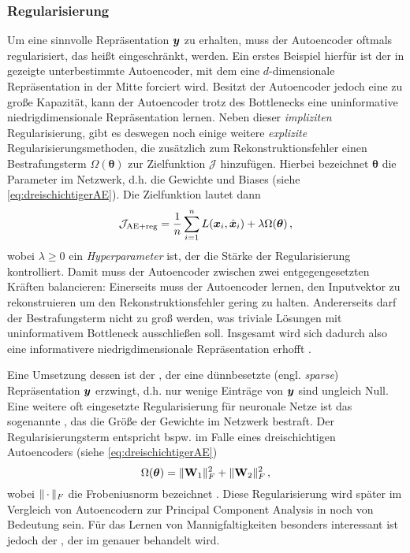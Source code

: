 \subsubsection{Regularisierung}
\label{ch:MethodenDerDimRed:ML:AE:Regularisierung}
Um eine sinnvolle Repräsentation $\bm{y}$ zu erhalten, muss der Autoencoder oftmals
regularisiert, das heißt eingeschränkt, werden. Ein erstes Beispiel hierfür ist der in
 gezeigte unterbestimmte Autoencoder, mit dem eine $d$-dimensionale
Repräsentation in der Mitte forciert wird. Besitzt der Autoencoder jedoch eine zu große Kapazität, kann der Autoencoder trotz des Bottlenecks
eine uninformative niedrigdimensionale Repräsentation lernen. Neben dieser \textit{impliziten} Regularisierung, gibt es deswegen noch einige
weitere \textit{explizite} Regularisierungsmethoden, die zusätzlich zum Rekonstruktionsfehler einen
Bestrafungsterm $\Omega(\bm{\theta})$ zur Zielfunktion $\mathcal{J}$ hinzufügen. Hierbei bezeichnet $\bm{\theta}$ die Parameter im Netzwerk, d.h. die Gewichte und Biases (siehe \eqref{eq:dreischichtigerAE}). Die Zielfunktion lautet dann
\begin{equation}
	\mathcal{J}_{\text{AE+reg}} = \frac{1}{n} \sum_{i = 1}^{n}  L(\bm{x}_i, \hat{\bm{x}}_i) + \lambda \Omega(\bm{\theta}) \, ,
\end{equation}
wobei $\lambda \geq 0$ ein \textit{Hyperparameter} ist, der die Stärke der Regularisierung kontrolliert. Damit muss der Autoencoder zwischen zwei entgegengesetzten Kräften balancieren: Einerseits muss der Autoencoder lernen, den Inputvektor zu rekonstruieren um den Rekonstruktionsfehler gering zu halten. Andererseits darf der Bestrafungsterm nicht zu groß werden, was triviale Lösungen mit uninformativem Bottleneck ausschließen soll. Insgesamt wird sich dadurch also eine informativere niedrigdimensionale Repräsentation erhofft \parencite[516]{Goodfellow.2016}.

Eine Umsetzung dessen ist der , der eine dünnbesetzte (engl.
\textit{sparse}) Repräsentation $\bm{y}$ erzwingt, d.h. nur wenige Einträge von $\bm{y}$ sind
ungleich Null. Eine weitere oft eingesetzte Regularisierung für neuronale Netze ist das sogenannte
, das die Größe der Gewichte im Netzwerk bestraft. Der Regularisierungsterm
entspricht bspw. im Falle eines dreischichtigen Autoencoders (siehe \eqref{eq:dreischichtigerAE})
\begin{equation}
	\label{eq:WeightDecay}
	\Omega(\bm{\theta}) = \lVert\mathbf{W}_1\rVert^2_F + \lVert\mathbf{W}_2\rVert^2_F \, ,
\end{equation}
wobei $\lVert\,\cdot\,\rVert_F$ die Frobeniusnorm bezeichnet \parencite[1]{Kunin.2019}. Diese Regularisierung wird später im Vergleich von Autoencodern zur
Principal Component Analysis in  noch von Bedeutung
sein. Für das Lernen von Mannigfaltigkeiten besonders interessant ist jedoch der
 \parencite{Rifai.2011}, der im  genauer behandelt wird.

